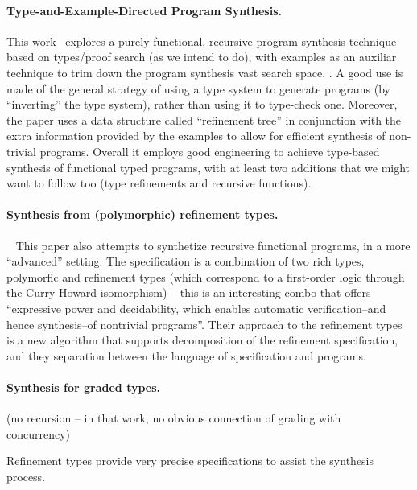 \documentclass{llncs}
\newcommand{\mypara}[1]{\paragraph{\textbf{#1}.}}
\begin{document}
\mypara{Type-and-Example-Directed Program Synthesis} This
work~\cite{DBLP:conf/pldi/OseraZ15,DBLP:conf/popl/FrankleOWZ16}
explores a purely functional, recursive program synthesis technique
based on types/proof search (as we intend to do), with examples as an
auxiliar technique to trim down the program synthesis vast search
space.  .  A good use is
made of the general strategy of using a type system to generate
programs (by ``inverting'' the type system), rather than using it to
type-check one.  Moreover, the paper uses a data structure called
``refinement tree'' in conjunction with the extra information provided
by the examples to allow for efficient synthesis of non-trivial
programs. Overall it employs good engineering to achieve type-based
synthesis of functional typed programs, with at least two additions
that we might want to follow too (type refinements and recursive
functions).

  
\mypara{Synthesis from (polymorphic) refinement types}~\cite{DBLP:conf/pldi/PolikarpovaKS16}
This paper also attempts to synthetize recursive functional programs, in a more ``advanced'' setting. The specification
is a combination of two rich types, polymorfic and refinement types (which correspond to a first-order logic through the Curry-Howard isomorphism) -- this is an interesting
combo that offers ``expressive power and decidability, which enables automatic verification--and hence synthesis--of nontrivial programs''.
Their approach to the refinement types is a new algorithm that supports decomposition of the refinement specification,
and they separation between the language of specification and programs.


\mypara{Synthesis for graded types} (no recursion   -- in that work, no
  obvious connection of grading with
  concurrency)~\cite{DBLP:conf/lopstr/HughesO20}
  

Refinement types provide very precise specifications to assist the
synthesis process.



\end{document}
